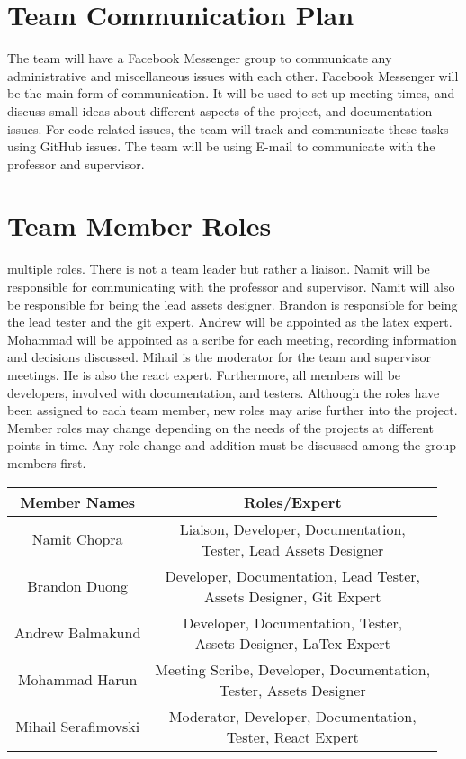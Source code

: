 \documentclass{article}
\begin{document}
\section{Team Communication Plan}
The team will have a Facebook Messenger group to communicate any administrative and miscellaneous issues with each other. Facebook Messenger will be the main form of communication. It will be used to set up meeting times, and discuss small ideas about different aspects of the project, and documentation issues. For code-related issues, the team will track and communicate these tasks using GitHub issues. The team will be using E-mail to communicate with the professor and supervisor.

\section{Team Member Roles}
multiple roles. There is not a team leader but rather a liaison. Namit will be responsible for communicating with the professor and supervisor. Namit will also be responsible for being the lead assets designer. Brandon is responsible for being the lead tester and the git expert. Andrew will be appointed as the latex expert. Mohammad will be appointed as a scribe for each meeting, recording information and decisions discussed. Mihail is the moderator for the team and supervisor meetings. He is also the react expert. Furthermore, all members will be developers, involved with documentation, and testers. Although the roles have been assigned to each team member, new roles may arise further into the project. Member roles may change depending on the needs of the projects at different points in time. Any role change and addition must be discussed among the group members first.


\begin{table}[h]
    \centering
    \begin{tabular}{|c|c|}
    \hline
         Member Names & Roles/Expert  \\
         \hline
         Namit Chopra & \shortstack{Liaison, Developer, Documentation, \\ Tester, Lead Assets Designer} \\
         \hline
         Brandon Duong & \shortstack{ Developer, Documentation, Lead Tester, \\Assets Designer, Git Expert }\\
         \hline
         Andrew Balmakund & \shortstack{ Developer, Documentation, Tester, \\ Assets Designer, LaTex Expert}\\
         \hline
         Mohammad Harun & \shortstack{Meeting Scribe,  Developer, Documentation, \\ Tester, Assets Designer} \\
         \hline
         Mihail Serafimovski & \shortstack{Moderator,  Developer, Documentation, \\ Tester, React Expert} \\
         \hline
    \end{tabular}
    \label{tab:my_label}
\end{table}
\end{document}
